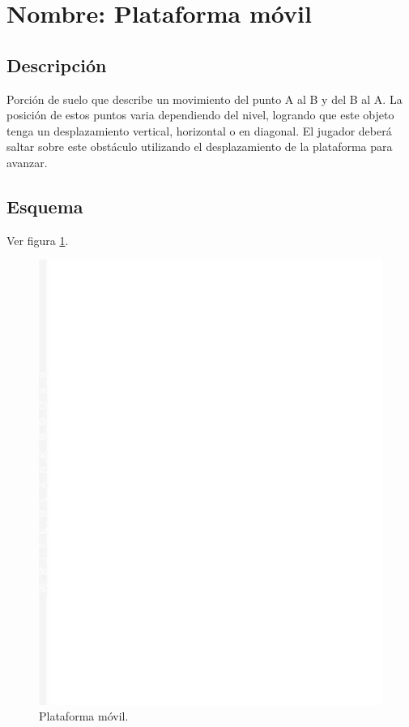 \section{Nombre: Plataforma móvil}\label{obs.plataformaM}
	\subsection{Descripción}
Porción de suelo que describe un movimiento del punto A al B y del B al A. La posición de estos puntos varia dependiendo del nivel, logrando que este objeto tenga un desplazamiento vertical, horizontal o en diagonal. El jugador deberá saltar sobre este obstáculo utilizando el desplazamiento de la plataforma para avanzar.
	\subsection{Esquema}
	Ver figura \ref{fig:plataformaM}.
	\begin{figure}
		\centering
		\includegraphics[height=0.2 \textheight]{Imagenes/plataformaM}
		\caption{Plataforma móvil.}
		\label{fig:plataformaM}
	\end{figure}